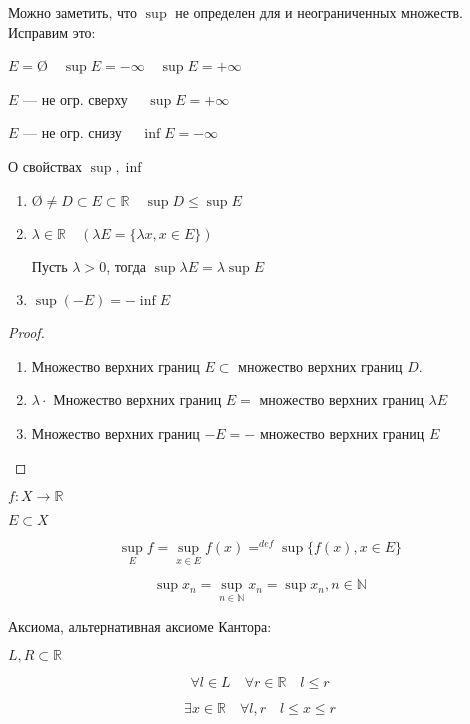 

\cfoot{}



Можно заметить, что $\sup$ не определен для \text{\O} и неограниченных множеств. Исправим это:

$E=$\O $\quad \sup E=-\infty \quad \sup E=+\infty$

$E$ --- не огр. сверху $\quad \sup E=+\infty$

$E$ --- не огр. снизу $\quad \inf E=-\infty$

\begin{lemma}
    О свойствах $\sup, \inf$
    \begin{enumerate}
        \item $\text{\O}\not =D\subset E\subset \mathbb{R} \quad \sup D\leq \sup E$
        \item $\lambda\in\mathbb{R} \quad (\lambda E=\{\lambda x, x\in E\})$

        Пусть $\lambda>0$, тогда $\sup \lambda E=\lambda\sup E$
        \item $\sup(-E)=-\inf E$
    \end{enumerate}
\end{lemma}

\begin{proof}
    \begin{enumerate}
        \item Множество верхних границ $E\subset$ множество верхних границ $D$.
        \item $\lambda\cdot$ Множество верхних границ $E =$ множество верхних границ $\lambda E$
        \item Множество верхних границ $-E = -$ множество верхних границ $E$
    \end{enumerate}
\end{proof}

$f: X\to\mathbb{R}$

$E\subset X$

$$\sup\limits_E f=\sup\limits_{x\in E} f(x) =^{def} \sup\{f(x), x\in E\}$$

$$\sup x_n = \sup\limits_{n\in\mathbb{N}} x_n=\sup{x_n, n\in\mathbb{N}}$$

\begin{axiom}
    Аксиома, альтернативная аксиоме Кантора:

    $L,R\subset \mathbb{R}$

    $$\forall l \in L \quad \forall r\in\mathbb{R} \quad l\leq r$$

    $$\exists x\in\mathbb{R} \quad \forall l, r \quad l\leq x\leq r$$
\end{axiom}

